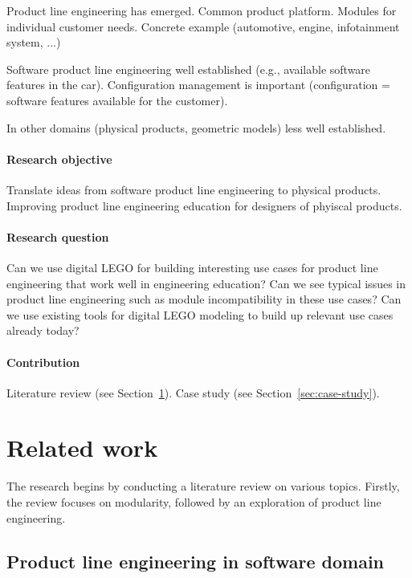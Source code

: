 \documentclass[sigconf,review]{acmart}
\begin{document}
Product line engineering has emerged. Common product platform. Modules for individual customer needs. Concrete example (automotive, engine, infotainment system, ...)

Software product line engineering well established (e.g., available software features in the car). Configuration management is important (configuration = software features available for the customer).

In other domains (physical products, geometric models) less well established.

\paragraph{Research objective}

Translate ideas from software product line engineering to physical products.
Improving product line engineering education for designers of phyiscal products.

\paragraph{Research question}

Can we use digital LEGO for building interesting use cases for product line engineering that work well in engineering education?
Can we see typical issues in product line engineering such as module incompatibility in these use cases?
Can we use existing tools for digital LEGO modeling to build up relevant use cases already today?

\paragraph{Contribution}

Literature review (see Section~\ref{sec:related-work}). Case study (see Section~\ref{sec:case-study}).

\section{Related work}
\label{sec:related-work}

The research begins by conducting a literature review on various topics. 
Firstly, the review focuses on modularity, followed by an exploration of product line engineering.


\subsection{Product line engineering in software domain}
\end{document}
